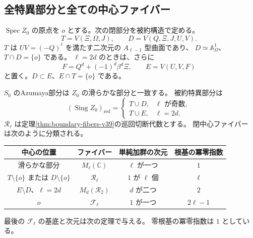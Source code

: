 \subsection{全特異部分と全ての中心ファイバー}

$\operatorname{Spec}Z_0$ の原点を $o$ とする。次の閉部分を被約構造で定める。
\begin{equation}\label{eq:global-strata-v40}
 T=V(\Xi,\Omega,J),\qquad
 D=V(Q,\Xi,J,U,V).
\end{equation}
$T$ は $UV=(-Q)^\ell$ を満たす二次元の $A_{\ell-1}$ 型曲面であり、
$D\simeq\mathbb A^1_\Omega$、$T\cap D=\{o\}$ である。
$\ell=2d$ のときは、さらに
\[
 F=Q^d+(-1)^d\beta^d\Xi,\qquad E=V(U,V,F)
\]
と置く。$D\subset E$、$E\cap T=\{o\}$ である。

\begin{theorem}[全Azumaya部分とファイバーの分類]
\label{thm:global-fibers-v40}
$S_0$ のAzumaya部分は $Z_0$ の滑らかな部分と一致する。
被約特異部分は
\[
 (\operatorname{Sing}Z_0)_{\mathrm{red}}=
 \begin{cases}
 T\cup D,&\ell\text{ が奇数},\\
 T\cup E,&\ell=2d.
 \end{cases}
\]
$\mathcal R_r$ は定理\ref{thm:boundary-fibers-v39}の巡回切断代数とする。
閉中心ファイバーは次のように分類される。
\begin{center}
\small
\begin{tabular}{c|c|c|c}
中心の位置&ファイバー&単純加群の次元&根基の冪零指数\\\hline
滑らかな部分&$M_\ell(\mathbb C)$&$\ell$ が一つ&$1$\\
$T\setminus\{o\}$ または $D\setminus\{o\}$&$\mathcal R_\ell$&$1$ が $\ell$ 個&$\ell$\\
$E\setminus D$、$\ell=2d$&$M_d(\mathcal R_2)$&$d$ が二つ&$2$\\
$o$&$\mathcal F_\ell$&$1$ が一つ&$2\ell-1$
\end{tabular}
\end{center}
最後の $\mathcal F_\ell$ の基底と次元は次の定理で与える。
零根基の冪零指数は $1$ としている。
\end{theorem}

